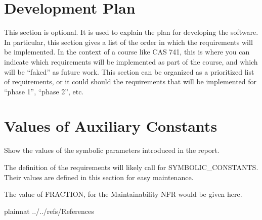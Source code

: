 \documentclass[12pt]{article}
\begin{document}



\section{Development Plan}

This section is optional.  It is used to explain the plan for developing the
software.  In particular, this section gives a list of the order in which the
requirements will be implemented.  In the context of a course like CAS 741, this
is where you can indicate which requirements will be implemented as part of the
course, and which will be ``faked'' as future work.  This section can be
organized as a prioritized list of requirements, or it could should the
requirements that will be implemented for ``phase 1'', ``phase 2'', etc.

\section{Values of Auxiliary Constants}

Show the values of the symbolic parameters introduced in the report.

The definition of the requirements will likely call for SYMBOLIC\_CONSTANTS.
Their values are defined in this section for easy maintenance.

The value of FRACTION, for the Maintainability NFR would be given here.

\newpage

 {plainnat}
 {../../refs/References}

\newpage
\end{document}
